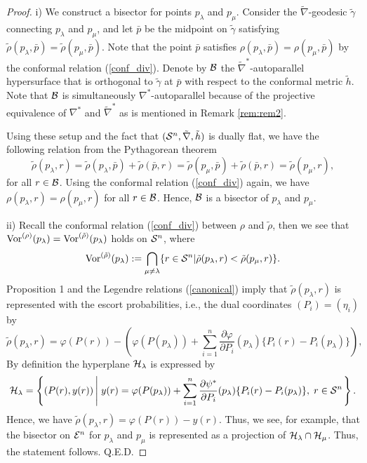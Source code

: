 \documentclass{llncs}
\begin{document}
\begin{proof}
i) We construct a bisector for points $p_\lambda$ and $p_\mu$.
Consider the $\tilde \nabla$-geodesic $\tilde \gamma$ 
connecting $p_\lambda$ and $p_\mu$, and 
let $\bar{p}$ be the midpoint on $\tilde \gamma$ satisfying 
$\tilde \rho(p_\lambda,\bar{p})=\tilde \rho(p_\mu,\bar{p})$.
Note that the point $\bar{p}$ satisfies 
$\rho(p_\lambda,\bar{p})=\rho(p_\mu,\bar{p})$ 
by the conformal relation (\ref{conf_div}). 
Denote by ${\cal B}$ the $\tilde \nabla^*$-autoparallel hypersurface 
that is orthogonal to $\tilde \gamma$ at $\bar{p}$ 
with respect to the conformal metric $\tilde h$.
Note that ${\cal B}$ is simultaneously $\nabla^*$-autoparallel because of the 
projective equivalence of $\nabla^*$ and $\tilde \nabla^*$ as is 
mentioned in Remark \ref{rem:rem2}.

Using these setup and the fact that 
$({\cal S}^n, \tilde \nabla, \tilde h)$ is dually flat, 
we have the following relation from the Pythagorean theorem \cite{AN}
\[
	\tilde \rho(p_\lambda,r)=\tilde \rho(p_\lambda,\bar{p})+\tilde \rho(\bar{p},r)
	=\tilde \rho(p_\mu,\bar{p})+\tilde \rho(\bar{p},r)
	=\tilde \rho(p_\mu,r),
\]
for all $r \in {\cal B}$.
Using the conformal relation (\ref{conf_div}) again, 
we have $\rho(p_\lambda,r)=\rho(p_\mu,r)$ for all $r \in {\cal B}$.
Hence, ${\cal B}$ is a bisector of $p_\lambda$ and $p_\mu$.

ii) Recall 
the conformal relation (\ref{conf_div}) 
between $\rho$ and $\tilde \rho$, then we see that 
${\rm Vor}^{(\rho)}(p_\lambda)={\rm Vor}^{(\tilde \rho)}(p_\lambda)$ 
holds on ${\cal S}^n$, where 
\[
	{\rm Vor}^{(\tilde \rho)}(p_\lambda):=\bigcap_{\mu \not= \lambda} 
	\{ r \in {\cal S}^n | 
	\tilde \rho(p_\lambda,r)< \tilde \rho(p_\mu,r) \}.
\]
Proposition 1 and the Legendre relations (\ref{canonical}) 
imply that $\tilde \rho(p_\lambda,r)$ 
is represented with the escort probabilities, i.e., 
the dual coordinates $(P_i)=(\eta_i)$ by
\[
	\tilde \rho(p_\lambda,r)=\varphi(P(r))
	-\left( \varphi(P(p_\lambda)) 
	+ \sum_{i=1}^n \frac{\partial \varphi}{\partial P_i} (p_\lambda)
	\{P_i(r) - P_i(p_\lambda)\} \right),
\]
By definition the hyperplane ${\cal H}_\lambda$ is expressed by
\[
	{\cal H}_\lambda=\left\{(P(r),y(r)) \left|\; y(r)= \varphi(P(p_\lambda)) 
	+ \sum_{i=1}^n \frac{\partial \psi^*}{\partial P_i} (p_\lambda)
	\{P_i(r) - P_i(p_\lambda)\}, \; r \in {\cal S}^n \right. \right\}.
\]
Hence, we have $\tilde \rho(p_\lambda,r)=\varphi(P(r))-y(r)$.
Thus, we see, for example, that the bisector on ${\cal E}^n$ for 
$p_\lambda$ and $p_\mu$ is represented as a projection of 
${\cal H}_\lambda \cap {\cal H}_\mu$.
Thus, the statement follows.
\hfill Q.E.D.
\end{proof}
\end{document}
